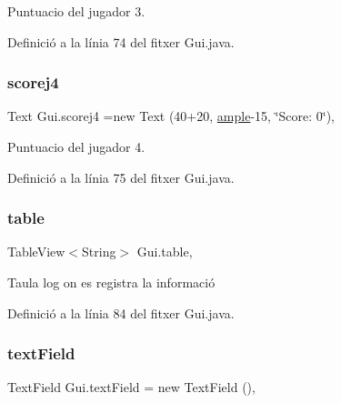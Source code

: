 Puntuacio del jugador 3. 



Definició a la línia 74 del fitxer Gui.\+java.

\mbox{\label{class_gui_ad8a03b9034810c4c580403c2c1efa1b7}} 
\subsubsection{\texorpdfstring{scorej4}{scorej4}}
{\footnotesize\ttfamily Text Gui.\+scorej4 =new Text (40+20, \mbox{\hyperlink{class_gui_a872c30141e879159a1c3d9958918fecd}{ample}}-\/15, \char`\"{}Score\+: 0\char`\"{})\hspace{0.3cm}{\ttfamily [static]}, {\ttfamily [private]}}



Puntuacio del jugador 4. 



Definició a la línia 75 del fitxer Gui.\+java.

\mbox{\label{class_gui_a7c14044a11ed6ac6b484cdc0d1a090ee}} 
\subsubsection{\texorpdfstring{table}{table}}
{\footnotesize\ttfamily Table\+View$<$String$>$ Gui.\+table\hspace{0.3cm}{\ttfamily [static]}, {\ttfamily [private]}}



Taula log on es registra la informació 



Definició a la línia 84 del fitxer Gui.\+java.

\mbox{\label{class_gui_aea36e0a7ecf10d53fa60708f54f36015}} 
\subsubsection{\texorpdfstring{text\+Field}{textField}}
{\footnotesize\ttfamily Text\+Field Gui.\+text\+Field = new Text\+Field ()\hspace{0.3cm}{\ttfamily [static]}, {\ttfamily [private]}}



